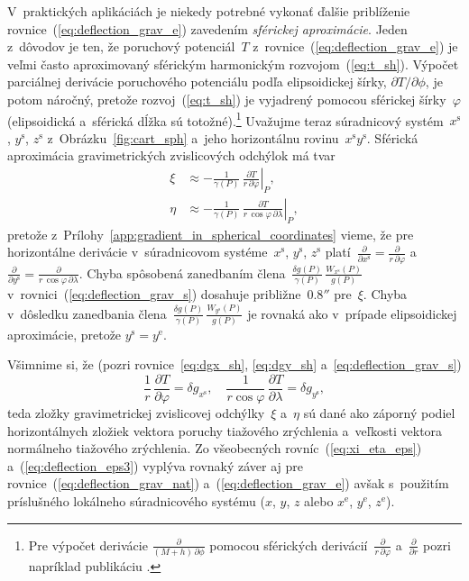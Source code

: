 \documentclass[a4paper, 12pt]{book}
\begin{document}
V~praktických aplikáciách je niekedy potrebné vykonať ďalšie priblíženie 
rovnice~(\ref{eq:deflection_grav_e}) zavedením \emph{sférickej aproximácie}.  
Jeden z~dôvodov je ten, že poruchový potenciál~$T$ 
z~rovnice~(\ref{eq:deflection_grav_e}) je veľmi často aproximovaný sférickým 
harmonickým rozvojom~(\ref{eq:t_sh}).  Výpočet parciálnej derivácie poruchového 
potenciálu podľa elipsoidickej šírky, $\partial T / \partial \phi$, je potom 
náročný, pretože rozvoj~(\ref{eq:t_sh}) je vyjadrený pomocou sférickej 
šírky~$\varphi$ (elipsoidická a~sférická dĺžka sú totožné).\footnote{Pre 
výpočet derivácie $\frac{\partial}{(M + h) \, \partial\phi}$ pomocou sférických 
derivácií~$\frac{\partial}{r \, \partial \varphi}$ a~$\frac{\partial}{\partial 
r}$ pozri napríklad publikáciu \textcite{Jekeli1999b}.}  Uvažujme teraz 
súradnicový systém~$x^\mathrm{s}$, $y^\mathrm{s}$, $z^\mathrm{s}$ 
z~Obrázku~\ref{fig:cart_sph} a~jeho horizontálnu 
rovinu~$x^\mathrm{s}y^\mathrm{s}$.  Sférická aproximácia gravimetrických 
zvislicových odchýlok má tvar \parencite{Jekeli1999b}
%
\begin{equation}
\label{eq:deflection_grav_s}
\begin{split}
\xi &\approx -\frac{1}{\gamma(P)} \, \left.\frac{\partial T}{r\, \partial 
\varphi}\right|_P{,}\\
%
\eta &\approx -\frac{1}{\gamma(P)} \, \left.\frac{\partial T}{r \, \cos\varphi 
\, \partial \lambda}\right|_P{,}
\end{split}
\end{equation}
%
pretože z~Prílohy~\ref{app:gradient_in_spherical_coordinates} vieme, že pre 
horizontálne derivácie v~súradnicovom systéme~$x^\mathrm{s}$, $y^\mathrm{s}$, 
$z^\mathrm{s}$ platí~$\frac{\partial}{\partial x^\mathrm{s}} 
= \frac{\partial}{r \, \partial\varphi}$ a~$\frac{\partial}{\partial 
y^\mathrm{s}} = \frac{\partial}{r \, \cos\varphi \, \partial\lambda}$.  Chyba 
spôsobená zanedbaním člena~$\frac{\delta g(P)}{\gamma(P)} \, 
\frac{W_{x^\mathrm{s}}(P)}{g(P)}$ v~rovnici~(\ref{eq:deflection_grav_s}) 
dosahuje približne~$0.8''$ pre~$\xi$.  Chyba v~dôsledku zanedbania 
člena~$\frac{\delta g(P)}{\gamma(P)} \, \frac{W_{y^\mathrm{s}}(P)}{g(P)}$ je 
rovnaká ako v~prípade elipsoidickej aproximácie, pretože $y^\mathrm{s} 
= y^\mathrm{e}$.

Všimnime si, že (pozri rovnice~\ref{eq:dgx_sh}, \ref{eq:dgy_sh} 
a~\ref{eq:deflection_grav_s})
%
\begin{equation}
\label{eq:dg_horizontal}
\frac{1}{r} \, \frac{\partial T}{\partial \varphi} = \delta g_{x^\mathrm{s}}{,} 
\quad \frac{1}{r \cos\varphi} \, \frac{\partial T}{\partial \lambda} = \delta 
g_{y^\mathrm{s}}{,}
\end{equation}
%
teda zložky gravimetrickej zvislicovej odchýlky~$\xi$ a~$\eta$ sú dané ako 
záporný podiel horizontálnych zložiek vektora poruchy tiažového zrýchlenia 
a~veľkosti vektora normálneho tiažového zrýchlenia.  Zo všeobecných 
rovníc~(\ref{eq:xi_eta_eps}) a~(\ref{eq:deflection_eps3}) vyplýva rovnaký záver 
aj pre rovnice~(\ref{eq:deflection_grav_nat}) a~(\ref{eq:deflection_grav_e}) 
avšak s~použitím príslušného lokálneho súradnicového systému ($x$, $y$, $z$ 
alebo $x^\mathrm{e}$, $y^\mathrm{e}$, $z^\mathrm{e}$).
\end{document}
